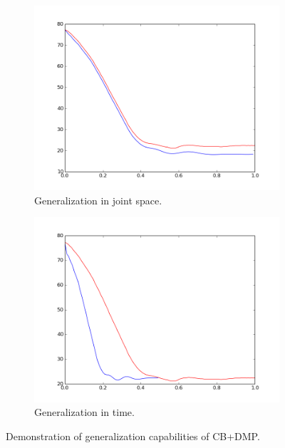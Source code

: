 \documentclass[a4paper]{article}
\begin{document}
 
\begin{figure}
\centering
\begin{subfigure}{.5\textwidth}
  \centering
  \includegraphics[width=.8\linewidth]{cb_dmp3.png}
  \caption{Generalization in joint space.}
  \label{fig:cbdmp3}
\end{subfigure}%
\begin{subfigure}{.5\textwidth}
  \centering
  \includegraphics[width=.8\linewidth]{cb_dmp4.png}
  \caption{Generalization in time.}
  \label{fig:cbdmp4}
\end{subfigure}
\caption{Demonstration of generalization capabilities of CB+DMP.}
\label{fig:ubot_gen}
\end{figure}
  
 
\end{document}
